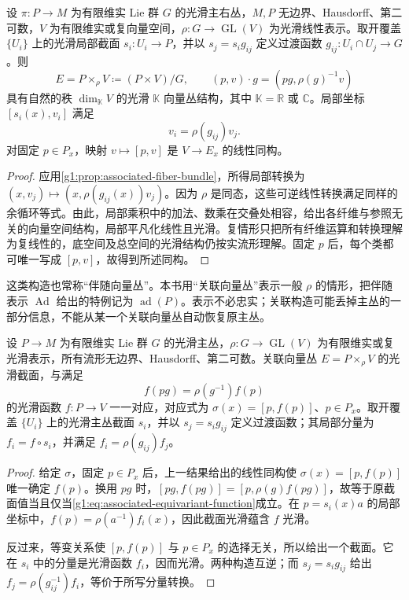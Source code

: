 \begin{theorem}\label{g1:thm:associated-vector-bundle}
	设 \(\pi:P\to M\) 为有限维实 Lie 群 \(G\) 的光滑主右丛，\(M,P\) 无边界、Hausdorff、第二可数，\(V\) 为有限维实或复向量空间，\(\rho:G\to\operatorname{GL}(V)\) 为光滑线性表示。取开覆盖 \(\{U_i\}\) 上的光滑局部截面 \(s_i:U_i\to P\)，并以 \(s_j=s_i g_{ij}\) 定义过渡函数 \(g_{ij}:U_i\cap U_j\to G\)。则
	\[
		E=P\times_\rho V\coloneqq(P\times V)/G,
		\qquad(p,v)\cdot g=(pg,\rho(g)^{-1}v)
	\]
	具有自然的秩 \(\dim_{\mathbb K}V\) 的光滑 \(\mathbb K\) 向量丛结构，其中 \(\mathbb K=\mathbb R\) 或 \(\mathbb C\)。局部坐标 \([s_i(x),v_i]\) 满足
	\begin{equation}\label{g1:eq:associated-vector-transition}
		v_i=\rho(g_{ij})v_j.
	\end{equation}
	对固定 \(p\in P_x\)，映射 \(v\mapsto[p,v]\) 是 \(V\to E_x\) 的线性同构。
\end{theorem}
\begin{proof}
	应用\cref{g1:prop:associated-fiber-bundle}，所得局部转换为 \((x,v_j)\mapsto(x,\rho(g_{ij}(x))v_j)\)。因为 \(\rho\) 是同态，这些可逆线性转换满足同样的余循环等式。由此，局部乘积中的加法、数乘在交叠处相容，给出各纤维与参照无关的向量空间结构，局部平凡化线性且光滑。复情形只把所有纤维运算和转换理解为复线性的，底空间及总空间的光滑结构仍按实流形理解。固定 \(p\) 后，每个类都可唯一写成 \([p,v]\)，故得到所述同构。
\end{proof}

这类构造也常称“伴随向量丛”。本书用“关联向量丛”表示一般 \(\rho\) 的情形，把伴随表示 \(\operatorname{Ad}\) 给出的特例记为 \(\operatorname{ad}(P)\)。表示不必忠实；关联构造可能丢掉主丛的一部分信息，不能从某一个关联向量丛自动恢复原主丛。

\begin{proposition}\label{g1:prop:associated-sections}
	设 \(P\to M\) 为有限维实 Lie 群 \(G\) 的光滑主丛，\(\rho:G\to\operatorname{GL}(V)\) 为有限维实或复光滑表示，所有流形无边界、Hausdorff、第二可数。关联向量丛 \(E=P\times_\rho V\) 的光滑截面，与满足
	\begin{equation}\label{g1:eq:associated-equivariant-function}
		f(pg)=\rho(g^{-1})f(p)
	\end{equation}
	的光滑函数 \(f:P\to V\) 一一对应，对应式为 \(\sigma(x)=[p,f(p)]\)、\(p\in P_x\)。取开覆盖 \(\{U_i\}\) 上的光滑主丛截面 \(s_i\)，并以 \(s_j=s_i g_{ij}\) 定义过渡函数；其局部分量为 \(f_i=f\circ s_i\)，并满足 \(f_i=\rho(g_{ij})f_j\)。
\end{proposition}
\begin{proof}
	给定 \(\sigma\)，固定 \(p\in P_x\) 后，上一结果给出的线性同构使 \(\sigma(x)=[p,f(p)]\) 唯一确定 \(f(p)\)。换用 \(pg\) 时，\([pg,f(pg)]=[p,\rho(g)f(pg)]\)，故等于原截面值当且仅当\eqref{g1:eq:associated-equivariant-function}成立。在 \(p=s_i(x)a\) 的局部坐标中，\(f(p)=\rho(a^{-1})f_i(x)\)，因此截面光滑蕴含 \(f\) 光滑。

	反过来，等变关系使 \([p,f(p)]\) 与 \(p\in P_x\) 的选择无关，所以给出一个截面。它在 \(s_i\) 中的分量是光滑函数 \(f_i\)，因而光滑。两种构造互逆；而 \(s_j=s_i g_{ij}\) 给出 \(f_j=\rho(g_{ij}^{-1})f_i\)，等价于所写分量转换。
\end{proof}


